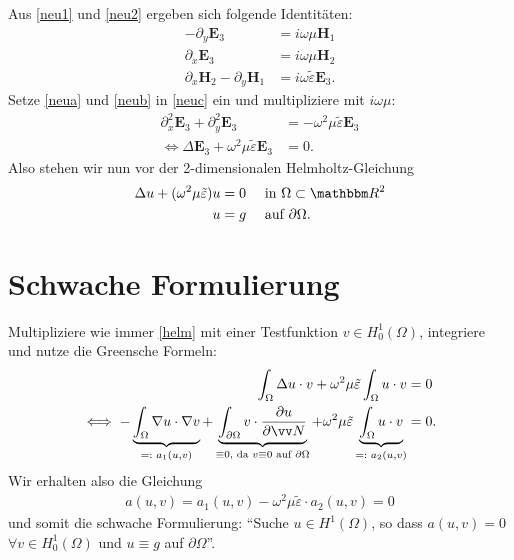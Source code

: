 \documentclass[ngerman,11pt,a4paper,titlepage]{article}
\begin{document}
%
Aus \eqref{neu1} und \eqref{neu2} ergeben sich folgende Identitäten:
\begin{align}
  - \partial_y \mathbf E_3 &= i\omega \mu \mathbf H_1 \label{neua} \\
  \partial_x \mathbf E_3 &= i\omega \mu \mathbf H_2 \label{neub} \\
  \partial_x \mathbf H_2 - \partial_y \mathbf H_1 &= i\omega \tilde \varepsilon \mathbf E_3. \label{neuc}
\end{align}
%
Setze \eqref{neua} und \eqref{neub} in \eqref{neuc} ein und multipliziere mit $i\omega \mu$:
\begin{align*}
  \partial_x^2 \mathbf E_3 + \partial_y^2 \mathbf E_3 &= -\omega^2\mu \tilde \varepsilon \mathbf E_3 \\
  \iff \Delta \mathbf E_3 + \omega^2\mu \tilde \varepsilon \mathbf E_3 &= 0.
\end{align*}
Also stehen wir nun vor der 2-dimensionalen Helmholtz-Gleichung
\begin{align}
  \Delta u + (\omega^2\mu \tilde \varepsilon) u &= 0 && \text{ in } \Omega \subset \mathbbm R^2 \label{helm} \\
  u &= g && \text{ auf } \partial \Omega. \label{rb}
\end{align}

\section{Schwache Formulierung}
Multipliziere wie immer \eqref{helm} mit einer Testfunktion $v\in H_0^1(\Omega)$, integriere und nutze die Greensche Formeln:
\begin{align*}
  \int_\Omega \Delta u \cdot v + \omega^2\mu \tilde \varepsilon \int_\Omega u\cdot v &= 0 \\
  \iff - \underbrace{\int_\Omega \nabla u \cdot \nabla v}_{=:\text{ }a_1(u,v)} +
    \underbrace{\int_{\partial \Omega} v\cdot \frac{\partial u}{\partial \vv N}}_{\equiv 0\text{, da } v \equiv 0 \text{ auf } \partial \Omega}
    + \omega^2\mu \tilde \varepsilon \underbrace{\int_\Omega u\cdot v}_{=:\text{ }a_2(u,v)} &= 0.
\end{align*}
Wir erhalten also die Gleichung
\begin{align*}
  a(u,v) = a_1(u,v) - \omega^2\mu \tilde \varepsilon \cdot a_2(u,v) = 0
\end{align*}
und somit die schwache Formulierung: "`Suche $u\in H^1(\Omega )$, so dass $a(u,v)=0$ $\forall v \in H_0^1(\Omega)$ und $u\equiv g$ auf $\partial\Omega$"'.
\end{document}
